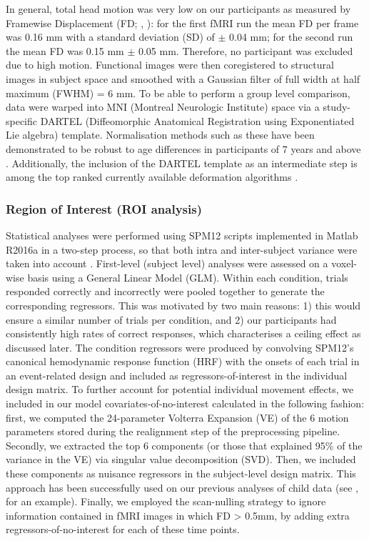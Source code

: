 In general, total head motion was very low on our participants as measured by Framewise Displacement (FD; \citeauthor{Power2014a}, \citeyear{Power2014a}): for the first fMRI run the mean FD per frame was 0.16 mm with a standard deviation (SD) of $\pm$ 0.04 mm; for the second run the mean FD was 0.15 mm $\pm$ 0.05 mm. Therefore, no participant was excluded due to high motion. Functional images were then coregistered to structural images in subject space and smoothed with a Gaussian filter of full width at half maximum (FWHM) = 6 mm. To be able to perform a group level comparison, data were warped into MNI (Montreal Neurologic Institute) space via a study-specific DARTEL (Diffeomorphic Anatomical Registration using Exponentiated Lie algebra) template. Normalisation methods such as these have been demonstrated to be robust to age differences in participants of 7 years and above \citep{ASHBURNER1998, Burgund2002}. Additionally, the inclusion of the DARTEL template as an intermediate step is among the top ranked currently available deformation algorithms \citep{Klein2009}. 

\subsubsection{Region of Interest (ROI analysis)} \label{section:OFC_ROIanal}
Statistical analyses were performed using SPM12 scripts implemented in Matlab R2016a in a two-step process, so that both intra and inter-subject variance were taken into account \citep{Friston1995a}. First-level (subject level) analyses were assessed on a voxel-wise basis using a General Linear Model (GLM). Within each condition, trials responded correctly and incorrectly were pooled together to generate the corresponding regressors. This was motivated by two main reasons: 1) this would ensure a similar number of trials per condition, and 2) our participants had consistently high rates of correct responses, which characterises a ceiling effect as discussed later. The condition regressors were produced by convolving SPM12’s canonical hemodynamic response function (HRF) with the onsets of each trial in an event-related design and included as regressors-of-interest in the individual design matrix. To further account for potential individual movement effects, we included in our model covariates-of-no-interest calculated in the following fashion: first, we computed the 24-parameter Volterra Expansion (VE) of the 6 motion parameters stored during the realignment step of the preprocessing pipeline. Secondly, we extracted the top 6 components (or those that explained 95\% of the variance in the VE) via singular value decomposition (SVD). Then, we included these components as nuisance regressors in the subject-level design matrix. This approach has been successfully used on our previous analyses of child data (see \citeauthor{Adam-Darque2018}, \citeyear{Adam-Darque2018} for an example). Finally, we employed the scan-nulling strategy \citep{Lemieux2007} to ignore information contained in fMRI images in which FD > 0.5mm, by adding extra regressors-of-no-interest for each of these time points.

